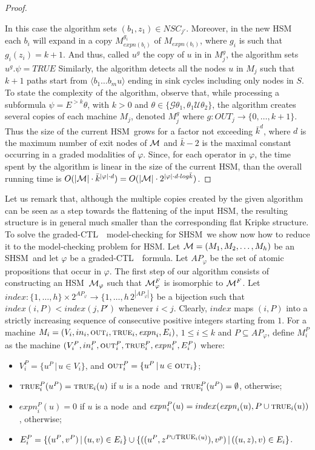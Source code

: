 \documentclass[letterpaper,twocolumn,10pt]{article}
\def    \ctl        {\mbox{\textsc{CTL }\xspace}}
\def    \U          {\mathcal{U}}
\def    \G          {\mathcal{G}}
\def    \M          {{\cal M}}
\newcommand{\VHSM}{SHSM}
\newcommand{\HSM}{HSM}
\newcommand{\nnode}{node} \newcommand{\nnodes}{nodes} \newcommand{\expand} {\mathit{expn}}
\newcommand{\OUT} {\mbox{\sc out}}
\newcommand{\prop}{\mbox{{\sc true}}}
\begin{document}
\begin{proof}
\begin{itemize}
\end{itemize}
In this case the algorithm
sets $(b_1,z_1) \in NSC_{j'} $.
Moreover, in  the new \HSM\, each $b_i$ will expand in a
copy $M_{\expand(b_i)}^{g_i}$ of $M_{\expand(b_i)}$,
where $g_i$ is such that $g_i(z_i)=k+1$. And thus, called $u^g$ the copy of
$u$ in  in $M_j^g$,  the algorithm sets $u^g.\psi = TRUE$
Similarly, the algorithm detects all the nodes $u$ in $M_j$ such that $k+1$ paths  start from
$ \langle b_1 \dots b_m u \rangle $  ending
in sink cycles including only nodes in $S$.
To state the complexity of the algorithm, observe that, while processing a subformula
$\psi=E^{> k} \theta$, with $k > 0$
and  $\theta \in \{ \G \theta_1, \theta_1 \U \theta_2 \} $, the algorithm creates several copies of each
machine $M_j$,
 denoted $M_j^g$ where  $g:OUT_j \rightarrow \{0,\ldots,k+1\}$. Thus the size of the
current \HSM\ grows for a factor not exceeding  $\bar k ^d$, where  $d$ is the maximum number of exit
nodes of $\M$ and $\bar k -2$ is the maximal constant occurring in a graded modalities of $\varphi$.
Since, for each  operator in $\varphi$, the time spent by  the algorithm is linear in the size of the current
\HSM, than the overall running time is $O(|\M|
\cdot \bar k^{ |\varphi|\cdot d })=O(|\M| \cdot 2^{ |\varphi|\cdot d \cdot log\bar k })$.
\end{proof}
Let us remark that, although the multiple copies created by the given algorithm can be seen
as a  step towards the flattening of
the input \HSM, the resulting structure is in general much smaller than the corresponding flat Kripke structure.
To solve the graded-\ctl\ model-checking for \VHSM\ we show now how to reduce it to the model-checking
problem for \HSM.
Let  $\M=(M_1,M_2,\ldots,M_h)$ be an  \VHSM\ and let $\varphi$ be a graded-\ctl\ formula.
Let $AP_\varphi$ be the set of atomic propositions that occur
in $\varphi$. The first step of our algorithm consists of constructing
an \HSM\ $\M_\varphi$ such that $\M_\varphi^F$ is isomorphic to $\M^F$.
Let $index:\{1,\ldots,h\}\times 2^{AP_\varphi}\rightarrow \{1,\ldots,h\,2^{|AP_\varphi|}\}$
be a bijection such that
$index(i,P)<index (j,P')$ whenever
$i<j$. Clearly, $index$ maps  $(i,P)$ into a strictly
increasing sequence of consecutive positive integers starting from $1$.
For a machine
$M_i=(V_i,in_i,\OUT_i, \prop_i,\expand_i, E_i)$, $1\le i\le k$ and
$P\subseteq AP_\varphi$,
define $M_i^P$ as the machine $(V_i^P,in_i^P,\OUT_i^P,
\prop_i^P,\expand_i^P, E_i^P)$
where:
\begin{itemize}
\item $V_i^P=\{u^P\,|\, u\in V_i\}$, and $\OUT_i^P=\{u^P\,|\, u\in \OUT_i\}$;
\item $\prop^P_i(u^P)=\prop_i(u)$ if $u$ is a \nnode\ and
      $\prop^P_i(u^P)=\emptyset$, otherwise;
\item $\expand_i^P(u)=0$ if $u$ is a \nnode\ and
      $\expand_i^P(u)=index(\expand_i(u),P\cup \prop_i(u))$, otherwise;
\item $E_i^P=\{(u^P,v^P)\,|\, (u,v)\in E_i\}\cup
             \{((u^P,z^{P\cup \prop_i(u)}), v^p)\,|\, ((u,z),v)\in E_i\}$.
\end{itemize}
\end{document}
